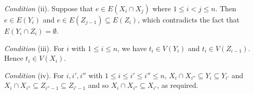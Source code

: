 \textit{Condition} (ii). Suppose that $e \in E(X_i \cap X_j)$ where $1 \le i < j \le n$. Then $e \in E(Y_i)$ and $e \in E(Z_{j-1}) \subseteq E(Z_i)$, which contradicts the fact that $E(Y_i \cap Z_i) = \emptyset$.

\textit{Condition} (iii). For $i$ with $1 \le i \le n$, we have $t_i \in V(Y_i)$ and $t_i \in V(Z_{i-1})$. Hence $t_i \in V(X_i)$.

\textit{Condition} (iv). For $i, i', i''$ with $1 \le i \le i' \le i'' \le n$, $X_i \cap X_{i''} \subseteq Y_i \subseteq Y_{i'}$ and $X_i \cap X_{i''} \subseteq Z_{i''-1} \subseteq Z_{i'-1}$ and so $X_i \cap X_{i''} \subseteq X_{i'}$, as required.
